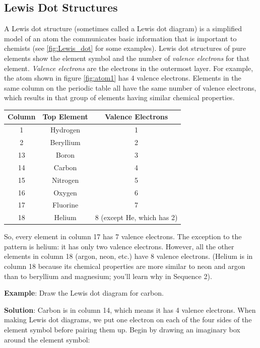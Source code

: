 \subsection{Lewis Dot Structures}
A Lewis dot structure (sometimes called a Lewis dot diagram) is a simplified 
model of an atom the communicates basic information that is important to chemists 
(see \ref{fig:Lewis_dot} for some examples). Lewis dot structures of pure 
elements show the element symbol and the number of \textit{valence electrons} for 
that element. \textit{Valence electrons} are the electrons in the outermost 
layer. For example, the atom shown in figure \ref{fig:atom1} has 4 valence 
electrons. Elements in the same column on the periodic table all have the same 
number of valence electrons, which results in that group of elements having 
similar chemical properties.  

\begin{center}
\begin{tabular}{|c|c|c|}
\hline
Column & Top Element & Valence Electrons\\\hline
1 & Hydrogen & 1\\\hline
2 & Beryllium & 2\\\hline
13 & Boron & 3\\\hline
14 & Carbon & 4\\\hline
15 & Nitrogen & 5\\\hline
16 & Oxygen & 6\\\hline
17 & Fluorine & 7\\\hline
18 & Helium & 8 (except He, which has 2)\\\hline
\end{tabular}
\end{center}

So, every element in column 17 has 7 valence electrons. The exception to the 
pattern is helium: it has only two valence electrons. However, all the other 
elements in column 18 (argon, neon, etc.) have 8 valence electrons. (Helium is in 
column 18 because its chemical properties are more similar to neon and argon than 
to beryllium and magnesium; you'll learn why in Sequence 2). 

\textbf{Example}: Draw the Lewis dot diagram for carbon.

\textbf{Solution}: Carbon is in column 14, which means it has 4 valence 
electrons. When making Lewis dot diagrams, we put one electron on each of the 
four sides of the element symbol before pairing them up. Begin by drawing an 
imaginary box around the element symbol:

